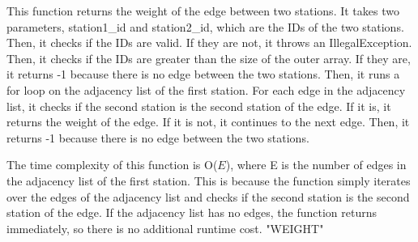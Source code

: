 			This function returns the weight of the edge between two stations. It takes two parameters, {\color{draculapurple}station1\_id} and {\color{draculapurple}station2\_id}, which are the IDs of the two stations.
			Then, it checks if the IDs are valid. If they are not, it throws an {\color{draculapurple}IllegalException}. Then, it checks if the IDs are greater than the size of the outer array. If they are, it returns {\color{draculapurple}-1} because there is no edge between the two stations.
			Then, it runs a for loop on the adjacency list of the first station. For each edge in the adjacency list, it checks if the second station is the second station of the edge. If it is, it returns the weight of the edge. If it is not, it continues to the next edge.
			Then, it returns {\color{draculapurple}-1} because there is no edge between the two stations.

			The time complexity of this function is {\color{lightblue}O($E$)}, where {\color{draculapurple}E} is the number of edges in the adjacency list of the first station. 
			This is because the function simply iterates over the edges of the adjacency list and checks if the second station is the second station of the edge. If 
			the adjacency list has no edges, the function returns immediately, so there is no additional runtime cost.
			{\color{GoldenYellow}"WEIGHT"}
